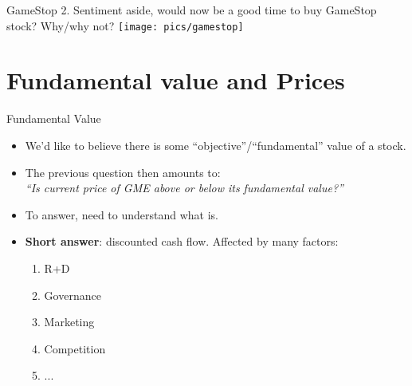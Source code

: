 \documentclass[english,10pt
,aspectratio=169
]{beamer}
\begin{document}
\begin{frame}{GameStop}
	2. Sentiment aside, would now be a good time to buy GameStop stock? Why/why not?
	\pause
	\texttt{[image: pics/gamestop]}
\end{frame}



\section{Fundamental value and Prices}

\begin{frame}{Fundamental Value}
	\begin{itemize}
		\item We'd like to believe there is some ``objective''/``fundamental'' value of a stock.
		\item The previous question then amounts to: \\
		\emph{``Is current price of GME above or below its fundamental value?''}
		\pause
		\item To answer, need to understand what  is.
		\pause
		\item \textbf{Short answer}: \alert{discounted cash flow}. Affected by many factors:
		\begin{enumerate}
			\item R+D
			\item Governance
			\item Marketing
			\item Competition
			\item ...
		\end{enumerate}
	\end{itemize}
\end{frame}
\end{document}
